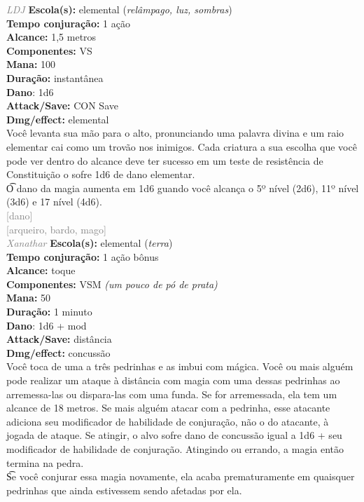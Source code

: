 \documentclass{RPG_Adventure}[2021/10/20]
\begin{document}
{\tiny \textcolor{gray}{\textit{LDJ}}}
{\small \t \textbf{Escola(s):} elemental (\textit{relâmpago, luz, sombras})\\\t \textbf{Tempo conjuração:} 1 ação\\\t \textbf{Alcance:} 1,5 metros\\\t \textbf{Componentes:} VS\\\t \textbf{Mana:} 100\\\t \textbf{Duração:} instantânea\\\t \textbf{Dano}: 1d6\\\t \textbf{Attack/Save:} CON Save\\\t \textbf{Dmg/effect:} elemental\\}
{\normalsize Você levanta sua mão para o alto, pronunciando uma palavra divina e um raio elementar cai como um trovão nos inimigos. Cada criatura a sua escolha que você pode ver dentro do alcance deve ter sucesso em um teste de resistência de Constituição o sofre 1d6 de dano elementar.\\\t O dano da magia aumenta em 1d6 guando você alcança o 5º nível (2d6), 11º nível (3d6) e 17 nível (4d6).\\}
{\scriptsize \textcolor{gray}{[dano]\\}}
{\scriptsize \textcolor{gray}{[arqueiro, bardo, mago]\\}}
{\tiny \textcolor{gray}{\textit{Xanathar}}}
{\small \t \textbf{Escola(s):} elemental (\textit{terra})\\\t \textbf{Tempo conjuração:} 1 ação bônus\\\t \textbf{Alcance:} toque\\\t \textbf{Componentes:} VSM \textit{(um pouco de pó de prata)}\\\t \textbf{Mana:} 50\\\t \textbf{Duração:} 1 minuto\\\t \textbf{Dano}: 1d6 + mod\\\t \textbf{Attack/Save:} distância\\\t \textbf{Dmg/effect:} concussão\\}
{\normalsize Você toca de uma a três pedrinhas e as imbui com mágica. Você ou mais alguém pode realizar um ataque à distância com magia com uma dessas pedrinhas ao arremessa-las ou dispara-las com uma funda. Se for arremessada, ela tem um alcance de 18 metros. Se mais alguém atacar com a pedrinha, esse atacante adiciona seu modificador de habilidade de conjuração, não o do atacante, à jogada de ataque. Se atingir, o alvo sofre dano de concussão igual a 1d6 + seu modificador de habilidade de conjuração. Atingindo ou errando, a magia então termina na pedra.\\\t Se você conjurar essa magia novamente, ela acaba prematuramente em quaisquer pedrinhas que ainda estivessem sendo afetadas por ela.\\}
\end{document}
